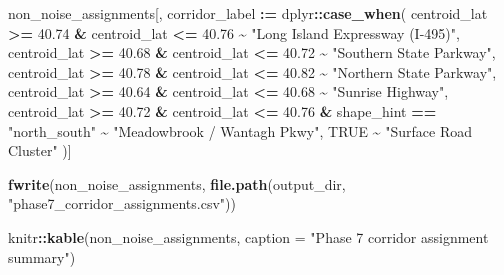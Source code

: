 \documentclass[
]{article}
\newenvironment{Shaded}{\begin{snugshade}}{\end{snugshade}}
\newcommand{\AttributeTok}[1]{\textcolor[rgb]{0.13,0.29,0.53}{#1}}
\newcommand{\ConstantTok}[1]{\textcolor[rgb]{0.56,0.35,0.01}{#1}}
\newcommand{\FloatTok}[1]{\textcolor[rgb]{0.00,0.00,0.81}{#1}}
\newcommand{\FunctionTok}[1]{\textcolor[rgb]{0.13,0.29,0.53}{\textbf{#1}}}
\newcommand{\NormalTok}[1]{#1}
\newcommand{\SpecialCharTok}[1]{\textcolor[rgb]{0.81,0.36,0.00}{\textbf{#1}}}
\newcommand{\StringTok}[1]{\textcolor[rgb]{0.31,0.60,0.02}{#1}}
\begin{document}
\begin{Shaded}
\begin{Highlighting}[]
\NormalTok{non\_noise\_assignments[, corridor\_label }\SpecialCharTok{:=}\NormalTok{ dplyr}\SpecialCharTok{::}\FunctionTok{case\_when}\NormalTok{(}
\NormalTok{  centroid\_lat }\SpecialCharTok{\textgreater{}=} \FloatTok{40.74} \SpecialCharTok{\&}\NormalTok{ centroid\_lat }\SpecialCharTok{\textless{}=} \FloatTok{40.76} \SpecialCharTok{\textasciitilde{}} \StringTok{"Long Island Expressway (I{-}495)"}\NormalTok{,}
\NormalTok{  centroid\_lat }\SpecialCharTok{\textgreater{}=} \FloatTok{40.68} \SpecialCharTok{\&}\NormalTok{ centroid\_lat }\SpecialCharTok{\textless{}=} \FloatTok{40.72} \SpecialCharTok{\textasciitilde{}} \StringTok{"Southern State Parkway"}\NormalTok{,}
\NormalTok{  centroid\_lat }\SpecialCharTok{\textgreater{}=} \FloatTok{40.78} \SpecialCharTok{\&}\NormalTok{ centroid\_lat }\SpecialCharTok{\textless{}=} \FloatTok{40.82} \SpecialCharTok{\textasciitilde{}} \StringTok{"Northern State Parkway"}\NormalTok{,}
\NormalTok{  centroid\_lat }\SpecialCharTok{\textgreater{}=} \FloatTok{40.64} \SpecialCharTok{\&}\NormalTok{ centroid\_lat }\SpecialCharTok{\textless{}=} \FloatTok{40.68} \SpecialCharTok{\textasciitilde{}} \StringTok{"Sunrise Highway"}\NormalTok{,}
\NormalTok{  centroid\_lat }\SpecialCharTok{\textgreater{}=} \FloatTok{40.72} \SpecialCharTok{\&}\NormalTok{ centroid\_lat }\SpecialCharTok{\textless{}=} \FloatTok{40.76} \SpecialCharTok{\&}\NormalTok{ shape\_hint }\SpecialCharTok{==} \StringTok{"north\_south"} \SpecialCharTok{\textasciitilde{}} \StringTok{"Meadowbrook / Wantagh Pkwy"}\NormalTok{,}
  \ConstantTok{TRUE} \SpecialCharTok{\textasciitilde{}} \StringTok{"Surface Road Cluster"}
\NormalTok{)]}

\FunctionTok{fwrite}\NormalTok{(non\_noise\_assignments, }\FunctionTok{file.path}\NormalTok{(output\_dir, }\StringTok{"phase7\_corridor\_assignments.csv"}\NormalTok{))}

\NormalTok{knitr}\SpecialCharTok{::}\FunctionTok{kable}\NormalTok{(non\_noise\_assignments, }\AttributeTok{caption =} \StringTok{"Phase 7 corridor assignment summary"}\NormalTok{)}
\end{Highlighting}
\end{Shaded}
\end{document}
